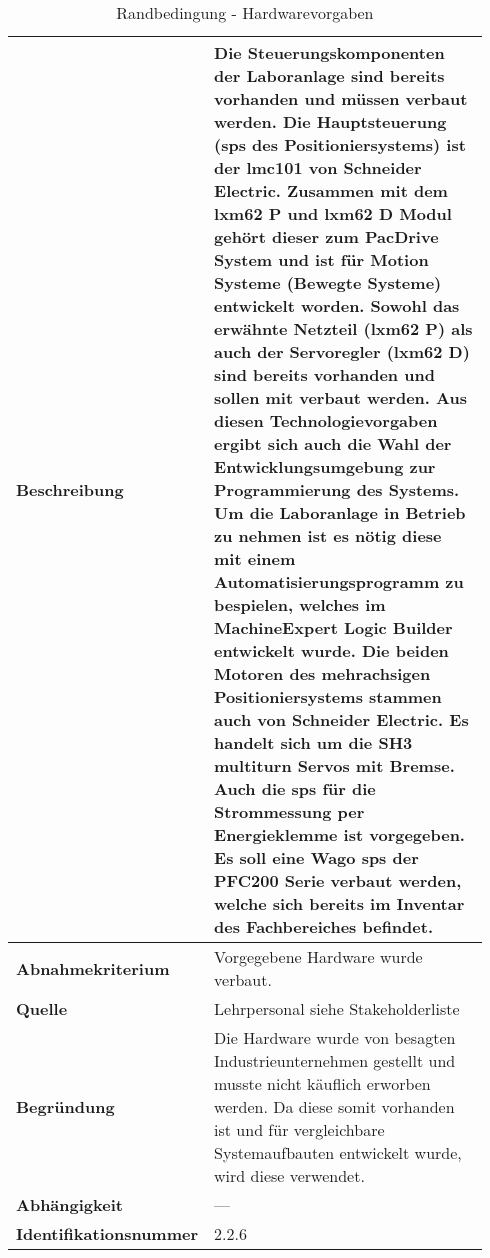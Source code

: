 \documentclass[../Bachelorarbeit.tex]{subfiles}
\begin{document}
\begin{table}[H]
    \centering
    \begin{tabular}{| p{0.34\linewidth} | p{0.6\linewidth} |}
        \hline
        \textbf{Beschreibung} & Die Steuerungskomponenten der Laboranlage sind bereits vorhanden und müssen verbaut werden. Die Hauptsteuerung (\acs{sps} des Positioniersystems) ist der \acs{lmc}101 von Schneider Electric. Zusammen mit dem \acs{lxm}62 P und \acs{lxm}62 D Modul gehört dieser zum PacDrive System und ist für Motion Systeme (Bewegte Systeme) entwickelt worden. Sowohl das erwähnte Netzteil (\acs{lxm}62 P) als auch der Servoregler (\acs{lxm}62 D) sind bereits vorhanden und sollen mit verbaut werden. Aus diesen Technologievorgaben ergibt sich auch die Wahl der Entwicklungsumgebung zur Programmierung des Systems. Um die Laboranlage in Betrieb zu nehmen ist es nötig diese mit einem Automatisierungsprogramm zu bespielen, welches im MachineExpert Logic Builder entwickelt wurde. Die beiden Motoren des mehrachsigen Positioniersystems stammen auch von Schneider Electric. Es handelt sich um die SH3 multiturn Servos mit Bremse. Auch die \acs{sps} für die Strommessung per Energieklemme ist vorgegeben. Es soll eine Wago \acs{sps} der PFC200 Serie verbaut werden, welche sich bereits im Inventar des Fachbereiches befindet. \\ \hline
        \textbf{Abnahmekriterium} & Vorgegebene Hardware wurde verbaut. \\ \hline
        \textbf{Quelle} & Lehrpersonal siehe Stakeholderliste \\ \hline
        \textbf{Begründung} & Die Hardware wurde von besagten Industrieunternehmen gestellt und musste nicht käuflich erworben werden. Da diese somit vorhanden ist und für vergleichbare Systemaufbauten entwickelt wurde, wird diese verwendet. \\ \hline
        \textbf{Abhängigkeit} & -\xspace -\xspace - \\ \hline
        \textbf{Identifikationsnummer} & 2.2.6 \\ \hline
    \end{tabular}
    \caption[\acs{nfa} - Hardwarevorgaben]{Randbedingung - Hardwarevorgaben}
    \label{tab:my-table26}
\end{table}

\end{document}
